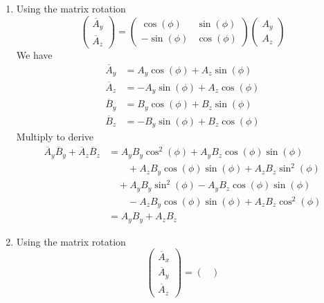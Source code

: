 \documentclass[a4paper]{article}
\begin{document}
\begin{enumerate}[label=(\alph*)]
	\item Using the matrix rotation
	\[
		\begin{pmatrix}
			\overline{A}_{y} \\
			\overline{A}_{z}
		\end{pmatrix}
		=
		\begin{pmatrix}
			\cos\!\left(\phi\right) & \sin\!\left(\phi\right) \\
			-\sin\!\left(\phi\right) & \cos\!\left(\phi\right)
		\end{pmatrix}
		\begin{pmatrix}
			A_{y} \\
			A_{z}
		\end{pmatrix}
	\]
	We have
	\begin{align*}
		\overline{A}_{y} & = A_{y}\cos\!\left(\phi\right) + A_{z}\sin\!\left(\phi\right) \\
		\overline{A}_{z} & = -A_{y}\sin\!\left(\phi\right) + A_{z}\cos\!\left(\phi\right) \\
		\overline{B}_{y} & = B_{y}\cos\!\left(\phi\right) + B_{z}\sin\!\left(\phi\right) \\
		\overline{B}_{z} & = -B_{y}\sin\!\left(\phi\right) + B_{z}\cos\!\left(\phi\right)
	\end{align*}
	Multiply to derive
	\begin{align*}
		\overline{A}_{y}\overline{B}_{y} + \overline{A}_{z}\overline{B}_{z} & = A_{y}B_{y}\cos^{2}\!\left(\phi\right) + A_{y}B_{z}\cos\!\left(\phi\right)\sin\!\left(\phi\right) \\
										    & \qquad + A_{z}B_{y}\cos\!\left(\phi\right)\sin\!\left(\phi\right) + A_{z}B_{z}\sin^{2}\!\left(\phi\right) \\ 
		 & \quad + A_{y}B_{y}\sin^{2}\!\left(\phi\right) - A_{y}B_{z}\cos\!\left(\phi\right)\sin\!\left(\phi\right) \\
		 & \qquad - A_{z}B_{y}\cos\!\left(\phi\right)\sin\!\left(\phi\right) + A_{z}B_{z}\cos^{2}\!\left(\phi\right) \\ 
		 & = A_{y}B_{y} + A_{z}B_{z}
	\end{align*}
	\item Using the matrix rotation
	\[
		\begin{pmatrix}
			\overline{A}_{x} \\
			\overline{A}_{y} \\
			\overline{A}_{z}
		\end{pmatrix}
		=
		\begin{pmatrix}

\end{pmatrix}\]
\end{enumerate}
\end{document}
